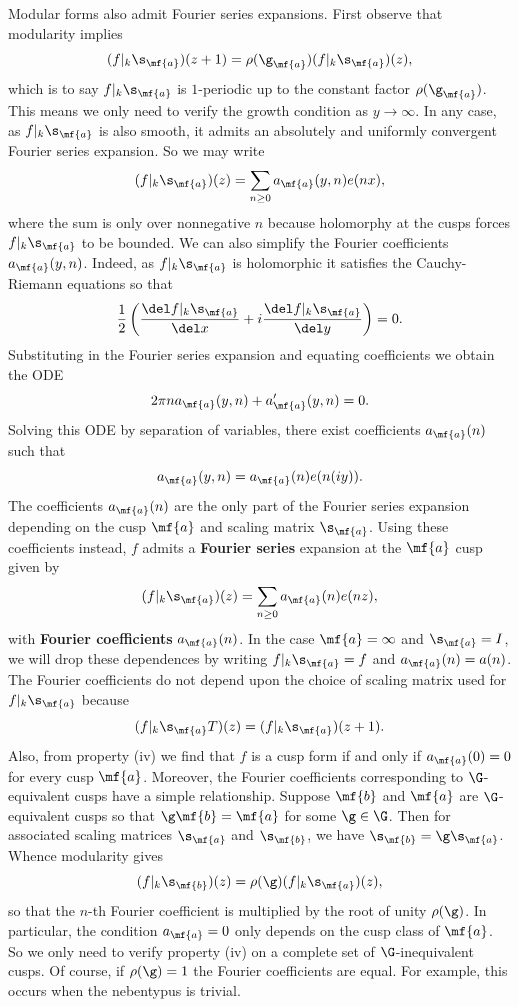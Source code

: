 \documentclass[12pt]{article}
\begin{document}
      Modular forms also admit Fourier series expansions. First observe that modularity implies
      \[
        (f|_{k}\s_{\mf{a}})(z+1) = \rho(\g_{\mf{a}})(f|_{k}\s_{\mf{a}})(z),
      \]
      which is to say \(f|_{k}\s_{\mf{a}}\) is \(1\)-periodic up to the constant factor \(\rho(\g_{\mf{a}})\). This means we only need to verify the growth condition as \(y \to \infty\). In any case, as \(f|_{k}\s_{\mf{a}}\) is also smooth, it admits an absolutely and uniformly convergent Fourier series expansion. So we may write
      \[
        (f|_{k}\s_{\mf{a}})(z) = \sum_{n \ge 0}a_{\mf{a}}(y,n)e(nx),
      \]
      where the sum is only over nonnegative \(n\) because holomorphy at the cusps forces \(f|_{k}\s_{\mf{a}}\) to be bounded. We can also simplify the Fourier coefficients \(a_{\mf{a}}(y,n)\). Indeed, as \(f|_{k}\s_{\mf{a}}\) is holomorphic it satisfies the Cauchy-Riemann equations so that
      \[
        \frac{1}{2}\left(\frac{\del f|_{k}\s_{\mf{a}}}{\del x}+i\frac{\del f|_{k}\s_{\mf{a}}}{\del y}\right) = 0.
      \]
      Substituting in the Fourier series expansion and equating coefficients we obtain the ODE
      \[
        2\pi na_{\mf{a}}(y,n)+a_{\mf{a}}'(y,n) = 0.
      \]
      Solving this ODE by separation of variables, there exist coefficients \(a_{\mf{a}}(n)\) such that
      \[
        a_{\mf{a}}(y,n) = a_{\mf{a}}(n)e(n(iy)).
      \]
      The coefficients \(a_{\mf{a}}(n)\) are the only part of the Fourier series expansion depending on the cusp \(\mf{a}\) and scaling matrix \(\s_{\mf{a}}\). Using these coefficients instead, \(f\) admits a \textbf{Fourier series} expansion at the \(\mf{a}\) cusp given by
      \[
        (f|_{k}\s_{\mf{a}})(z) = \sum_{n \ge 0}a_{\mf{a}}(n)e(nz),
      \]
      with \textbf{Fourier coefficients} \(a_{\mf{a}}(n)\). In the case \(\mf{a} = \infty\) and \(\s_{\mf{a}} = I\), we will drop these dependences by writing \(f|_{k}\s_{\mf{a}} = f\) and \(a_{\mf{a}}(n) = a(n)\). The Fourier coefficients do not depend upon the choice of scaling matrix used for \(f|_{k}\s_{\mf{a}}\) because
      \begin{equation}\label{equ:cusp_form_independence_of_scaling_matrix_modular}
        (f|_{k}\s_{\mf{a}}T)(z) = (f|_{k}\s_{\mf{a}})(z+1).
      \end{equation}
      Also, from property (iv) we find that \(f\) is a cusp form if and only if \(a_{\mf{a}}(0) = 0\) for every cusp \(\mf{a}\). Moreover, the Fourier coefficients corresponding to \(\G\)-equivalent cusps have a simple relationship. Suppose \(\mf{b}\) and \(\mf{a}\) are \(\G\)-equivalent cusps so that \(\g\mf{b} = \mf{a}\) for some \(\g \in \G\). Then for associated scaling matrices \(\s_{\mf{a}}\) and \(\s_{\mf{b}}\), we have \(\s_{\mf{b}} = \g\s_{\mf{a}}\). Whence modularity gives
      \[
        (f|_{k}\s_{\mf{b}})(z) = \rho(\g)(f|_{k}\s_{\mf{a}})(z),
      \]
      so that the \(n\)-th Fourier coefficient is multiplied by the root of unity \(\rho(\g)\). In particular, the condition \(a_{\mf{a}} = 0\) only depends on the cusp class of \(\mf{a}\). So we only need to verify property (iv) on a complete set of \(\G\)-inequivalent cusps. Of course, if \(\rho(\g) = 1\) the Fourier coefficients are equal. For example, this occurs when the nebentypus is trivial.
\end{document}
